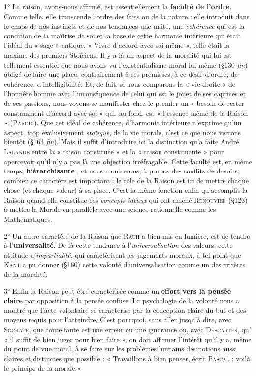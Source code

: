 1° La raison, avons-nous affirmé, est essentiellement la {\bf faculté
de l’ordre}. Comme telle, elle transcende l’ordre des faits ou de la
nature : elle introduit dans le chaos de nos instincts et de nos tendances
une unité, une {\it cohérence} qui est la condition de la maîtrise de soi et
la base de cette harmonie intérieure qui était l'idéal du « sage »
antique. « Vivre d’accord avec soi-même », telle était la maxime des
premiers Stoïciens. Il y a là un aspect de la moralité qui lui est tellement
essentiel que nous avons vu l’existentialisme moral lui-même
(\S 130 {\it fin}) obligé de faire une place, contrairement à ses prémisses,
à ce désir d’ordre, de cohérence, d’intelligibilité. Et, de fait, si nous
comparons la « vie droite » de l’honnête homme avec l’inconséquence
de celui qui est le jouet de ses caprices et de ses passions, nous voyons
se manifester chez le premier un « besoin de rester constamment
d’accord avec soi » qui, au fond, est « l'essence même de la Raison »
(\textsc{Parodi}). Que cet idéal de cohérence, d'harmonie intérieure n’exprime
qu’un aspect, trop exclusivement {\it statique}, de la vie morale, c'est ce
que nous verrons bientôt (\S 163 {\it fin}). Mais il suffit d'introduire ici
la distinction qu’a faite André \textsc{Lalande} entre la « raison constituée »
et la « raison constituante » pour apercevoir qu’il n’y a pas
là une objection irréfragable. Cette faculté est, en même temps,
{\bf hiérarchisante} ; et nous montrerons, à propos des conflits de devoirs,
combien ce caractère est important : le rôle de la Raison est ici de
mettre chaque chose (et chaque valeur) à sa place. C’est la même
fonction enfin qu’accomplit la Raison quand elle constitue ces {\it concepts
idéaux} qui ont amené \textsc{Renouvier} (\S 123) à mettre la Morale en
parallèle avec une science rationnelle comme les Mathématiques.

2° Un autre caractère de la Raison que \textsc{Rauh} a bien mis en lumière,
est de tendre à l’{\bf universalité}. De là cette tendance à l’{\it universalisation}
des valeurs, cette attitude d’{\it impartialité}, qui caractérisent les
jugements moraux, à tel point que \textsc{Kant} a pu donner (\S 160) cette
volonté d’universalisation comme un des critères de la moralité.

3° Enfin la Raison peut être caractérisée comme un {\bf effort vers la
pensée claire} par opposition à la pensée confuse. La psychologie
de la volonté nous a montré que l’acte volontaire se caractérise par
la conception claire du but et des moyens requis pour l’atteindre.
C’est pourquoi, sans aller jusqu’à dire, avec \textsc{Socrate}, que toute faute
est une erreur ou une ignorance ou, avec \textsc{Descartes}, qu’ « il suffit de
bien juger pour bien faire », on doit affirmer l’intérêt qu’il y a, même
du point de vue moral, à se faire sur les problèmes humains des
notions aussi claires et distinctes que possible : « Travaillons à bien
penser, écrit \textsc{Pascal} : voilà le principe de la morale.»

